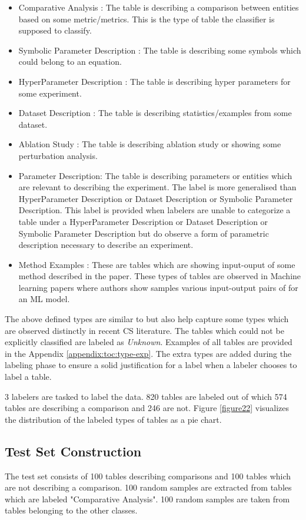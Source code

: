 \begin{itemize}
    \item Comparative Analysis : The table is describing a comparison between entities based on some metric/metrics. This is the type of table the classifier is supposed to classify.
    \item Symbolic Parameter Description : The table is describing some symbols which could belong to an equation.
    \item HyperParameter Description : The table is describing hyper parameters for some experiment.
    \item Dataset Description : The table is describing statistics/examples from some dataset. 
    \item Ablation Study : The table is describing ablation study or showing some perturbation analysis.
    \item Parameter Description: The table is describing parameters or entities which are relevant to describing the experiment. The label is more generalised than HyperParameter Description or Dataset Description or Symbolic Parameter Description. This label is provided when labelers are unable to categorize a table under a HyperParameter Description or Dataset Description or Symbolic Parameter Description but do observe a form of parametric description necessary to describe an experiment.  
    \item Method Examples : These are tables which are showing input-ouput of some method described in the paper. These types of tables are observed in Machine learning papers where authors show samples various input-output pairs of for an ML model.
\end{itemize}
The above defined types are similar to \cite{kim2012scientific} but also help capture some types which are observed distinctly in recent CS literature. The tables which could not be explicitly classified are labeled as \textit{Unknown}. Examples of all tables are provided in the Appendix \ref{appendix:toc:type-exp}. The extra types are added during the labeling phase to ensure a solid justification for a label when a labeler chooses to label a table. 

3 labelers are tasked to label the data. 820 tables are labeled out of which 574 tables are describing a comparison and 246 are not. Figure \ref{figure22} visualizes the distribution of the labeled types of tables as a pie chart. 

\subsection{Test Set Construction}
\label{table_classification:data-coll:test}
The test set consists of 100 tables describing comparisons and 100 tables which are not describing a comparison. 100 random samples are extracted from tables which are labeled "Comparative Analysis". 100 random samples are taken from tables belonging to the other classes. 

